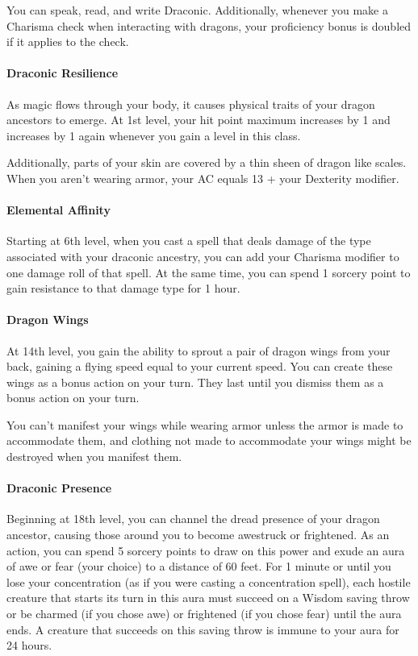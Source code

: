 \documentclass[
]{article}
\begin{document}
You can speak, read, and write Draconic. Additionally, whenever you make
a Charisma check when interacting with dragons, your proficiency bonus
is doubled if it applies to the check.

\hypertarget{draconic-resilience}{%
\paragraph{Draconic Resilience}\label{draconic-resilience}}

As magic flows through your body, it causes physical traits of your
dragon ancestors to emerge. At 1st level, your hit point maximum
increases by 1 and increases by 1 again whenever you gain a level in
this class.

Additionally, parts of your skin are covered by a thin sheen of dragon
like scales. When you aren't wearing armor, your AC equals 13 + your
Dexterity modifier.

\hypertarget{elemental-affinity}{%
\paragraph{Elemental Affinity}\label{elemental-affinity}}

Starting at 6th level, when you cast a spell that deals damage of the
type associated with your draconic ancestry, you can add your Charisma
modifier to one damage roll of that spell. At the same time, you can
spend 1 sorcery point to gain resistance to that damage type for 1 hour.

\hypertarget{dragon-wings}{%
\paragraph{Dragon Wings}\label{dragon-wings}}

At 14th level, you gain the ability to sprout a pair of dragon wings
from your back, gaining a flying speed equal to your current speed. You
can create these wings as a bonus action on your turn. They last until
you dismiss them as a bonus action on your turn.

You can't manifest your wings while wearing armor unless the armor is
made to accommodate them, and clothing not made to accommodate your
wings might be destroyed when you manifest them.

\hypertarget{draconic-presence}{%
\paragraph{Draconic Presence}\label{draconic-presence}}

Beginning at 18th level, you can channel the dread presence of your
dragon ancestor, causing those around you to become awestruck or
frightened. As an action, you can spend 5 sorcery points to draw on this
power and exude an aura of awe or fear (your choice) to a distance of 60
feet. For 1 minute or until you lose your concentration (as if you were
casting a concentration spell), each hostile creature that starts its
turn in this aura must succeed on a Wisdom saving throw or be charmed
(if you chose awe) or frightened (if you chose fear) until the aura
ends. A creature that succeeds on this saving throw is immune to your
aura for 24 hours.
\end{document}
